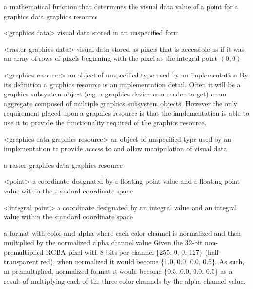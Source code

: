 a mathematical function that determines the visual data value of a point for a graphics data graphics resource

<graphics data> visual data stored in an unspecified form

<raster graphics data> visual data stored as pixels that is accessible as if it was an array of rows of pixels beginning with the pixel at the integral point $(0,0)$

<graphics resource> an object of unspecified type used by an implementation
\enternote
By its definition a graphics resource is an implementation detail. Often it will be a graphics subsystem object (e.g. a graphics device or a render target) or an aggregate composed of multiple graphics subsystem objects. However the only requirement placed upon a graphics resource is that the implementation is able to use it to provide the functionality required of the graphics resource.
\exitnote

<graphics data graphics resource> an object of unspecified type used by an implementation to provide access to and allow manipulation of visual data

\indexdefn{\pixmap}
a raster graphics data graphics resource

<point> a coordinate designated by a floating point \xaxis{} value and a floating point \yaxis{} value within the standard coordinate space

<integral point> a coordinate designated by an integral \xaxis{} value and an integral \yaxis{} value within the standard coordinate space

a format with color and alpha where each color channel is normalized and then 
multiplied by the normalized alpha channel value
\enterexample
Given the 32-bit non-premultiplied RGBA pixel with 8 bits per channel \{255, 0, 
0, 127\} (half-transparent red), when normalized it would become \{1.0, 0.0, 
0.0, 0.5\}. As such, in premultiplied, normalized format it would become \{0.5, 
0.0, 0.0, 0.5\} as a result of multiplying each of the three color channels by 
the alpha channel value.
\exitexample

